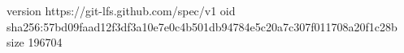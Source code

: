 version https://git-lfs.github.com/spec/v1
oid sha256:57bd09faad12f3df3a10e7e0c4b501db94784e5c20a7c307f011708a20f1c28b
size 196704
